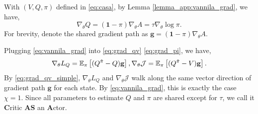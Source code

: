 With $(V, Q, \pi)$ defined in \eqref{eq:casa}, 
by Lemma \ref{lemma_app:vannila_grad}, we have, 
\begin{equation}
    \label{eq:vannila_grad}
\nabla_\theta Q =  (\textbf{1} - \pi) \nabla_\theta A = \tau \nabla_\theta \log \pi .
\end{equation}
For brevity, denote the shared gradient path as
$\textbf{g} = (\textbf{1} - \pi) \nabla_\theta A.$

Plugging \eqref{eq:vannila_grad} into \eqref{eq:grad_qv} \eqref{eq:grad_pi}, we have,
\begin{equation}
\label{eq:grad_qv_simple}
\begin{aligned}
        \nabla_\theta L_Q = \mathbb{E}_\pi \left[ (Q^{\Tilde{\pi}} - Q) \textbf{g} \right], 
\nabla_\theta \mathcal{J} = \mathbb{E}_\pi \left[ (Q^{\Tilde{\pi}} - V) \textbf{g} \right].
\end{aligned}
\end{equation}
{ By \eqref{eq:grad_qv_simple}, $\nabla_\theta L_Q$ and $\nabla_\theta \mathcal{J}$ walk along the same vector direction of gradient path $\textbf{g}$ for each state.}
{ By \eqref{eq:vannila_grad}, this is exactly the case $\chi = 1$.}
Since all parameters to estimate $Q$ and $\pi$ are shared except for $\tau$, we call it \textbf{C}ritic \textbf{AS} an \textbf{A}ctor.

